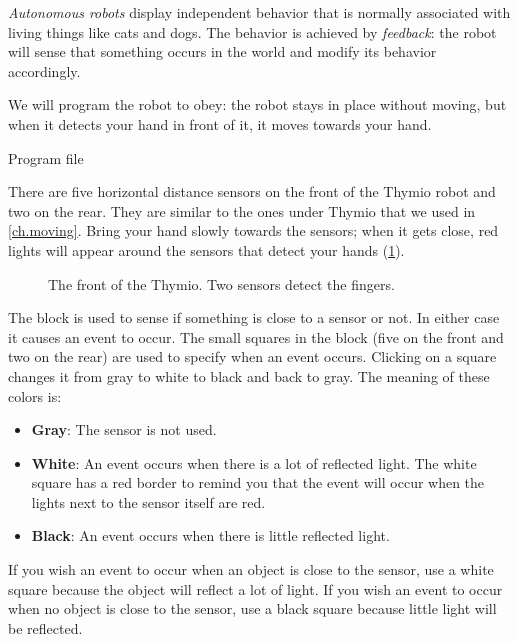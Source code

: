 \label{ch.pet}

\emph{Autonomous robots} display independent behavior that is normally
associated with living things like cats and dogs. The behavior is
achieved by \textit{feedback}: the robot will sense that something
occurs in the world and modify its behavior accordingly.


We will program the robot to obey: the robot stays in place without
moving, but when it detects your hand in front of it, it moves towards
your hand.

{\raggedleft \hfill Program file }

There are five horizontal distance sensors on the front of the Thymio
robot and two on the rear. They are similar to the ones under Thymio
that we used in \cref{ch.moving}. Bring your hand slowly towards the
sensors; when it gets close, red lights will appear around the sensors
that detect your hands (\cref{fig.detect}).

\begin{figure}
\begin{center}
\caption{The front of the Thymio. Two sensors detect the fingers.}\label{fig.detect}
\end{center}
\end{figure}

The block  is used to sense if something is close to a
sensor or not. In either case it causes an event to occur. The small
squares in the block (five on the front and two on the rear) are used to
specify when an event occurs. Clicking on a square changes it from gray
to white to black and back to gray. The meaning of
these colors is:

\begin{itemize}
\item \textbf{Gray}: The sensor is not used.
\item \textbf{White}: An event occurs when there is a lot of reflected
light.\label{p.proximity-colors2}
The white square has a red border
to remind you that the event will occur when the lights next to the sensor 
itself are red.
\item \textbf{Black}: An event occurs when there is little reflected
light.
\end{itemize}

If you wish an event to occur when an object is close to the sensor, use
a white square because the object will reflect a lot of light. If you
wish an event to occur when no object is close to the sensor, use a
black square because little light will be reflected.

